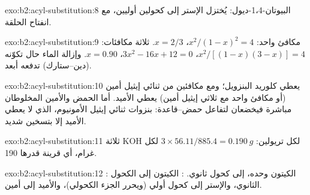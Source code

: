 \begin{solution}{exo:b2:acyl-substitution:8}
البيوتان-1،4-ديول: يُختزل الإستر إلى كحولين أوليين، مع انفتاح الحلقة.
\end{solution}

\begin{solution}{exo:b2:acyl-substitution:9}
مكافئ واحد: $x^2/(1 - x)^2 = 4$، $x = 2/3$. ثلاثة مكافئات: $x^2/[(1 - x)(3 - x)] = 4$، $3x^2 - 16x
+ 12 = 0$، $x = 0.90$. وإزالة الماء حال تكوّنه (دين--ستارك) تدفعه أبعد.
\end{solution}

\begin{solution}{exo:b2:acyl-substitution:10}
يعطي  كلوريد البنزويل؛ ومع مكافئين من ثنائي إيثيل أمين (أو مكافئ واحد مع ثلاثي إيثيل أمين)
يعطي الأميد. أما الحمض والأمين المخلوطان مباشرة فيخضعان لتفاعل حمض--قاعدة: بنزوات ثنائي إيثيل
الأمونيوم، الذي لا يعطي الأميد إلا بتسخين شديد.
\end{solution}

\begin{solution}{exo:b2:acyl-substitution:11}
ثلاثة KOH لكل تريولين: $3 \times 56.11/885.4 = \qty{0.190}{g}$ لكل غرام، أي قرينة  قدرها
190.
\end{solution}

\begin{solution}{exo:b2:acyl-substitution:12}
: الكيتون وحده، إلى كحول ثانوي. : الكيتون إلى الكحول الثانوي،
والإستر إلى كحول أولي (ويحرر الجزء الكحولي)، والأميد إلى أمين.
\end{solution}

